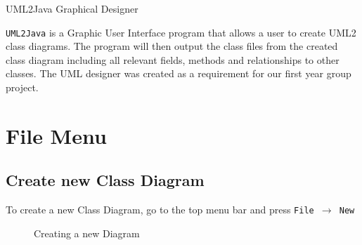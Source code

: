 \documentclass[a4paper]{article}
\begin{document}


\newcommand{\imagespace}[0]{\ \ \ \ \ \ \ }
\setlength\fboxsep{0pt}
\setlength\fboxrule{0.7pt}

\begin{center}\huge{UML2Java Graphical Designer}
\end{center}

\texttt{UML2Java} is a Graphic User Interface program that allows a user to create UML2 class diagrams. The program will then output the class files from the created class diagram including all relevant fields, methods and relationships to
other classes. The UML designer was created as a requirement for our first year group project.

\newpage
\tableofcontents 
\newpage

\section{File Menu} 

\subsection{Create new Class Diagram} 
To create a new Class Diagram, go to the top menu bar and press \texttt{File $\rightarrow$ New}
\begin{figure}[H] \begin{center} 
\caption{Creating a new Diagram} \vspace{-20pt}
\end{center} \end{figure}
\end{document}
